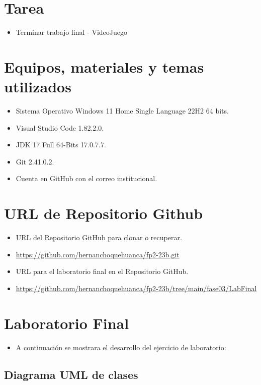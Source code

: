 \documentclass{article}
\begin{document}
	\section{Tarea}
	\begin{itemize}		
		\item Terminar trabajo final - VideoJuego
	\end{itemize}
		
	\section{Equipos, materiales y temas utilizados}
	\begin{itemize}
		\item Sistema Operativo Windows 11 Home Single Language 22H2 64 bits.
		\item Visual Studio Code 1.82.2.0.
		\item JDK 17 Full 64-Bits 17.0.7.7.
		\item Git 2.41.0.2.
		\item Cuenta en GitHub con el correo institucional.
	\end{itemize}
	
	\section{URL de Repositorio Github}
	\begin{itemize}
		\item URL del Repositorio GitHub para clonar o recuperar.
		\item \url{https://github.com/hernanchoquehuanca/fp2-23b.git}
		\item URL para el laboratorio final en el Repositorio GitHub.
		\item \url{https://github.com/hernanchoquehuanca/fp2-23b/tree/main/fase03/LabFinal}
	\end{itemize}
	
	\section{Laboratorio Final}
	
	\begin{itemize}	
		\item A continuación se mostrara el desarrollo del ejercicio de laboratorio:
	\end{itemize}
	
	\subsection{Diagrama UML de clases}
	
\end{document}

